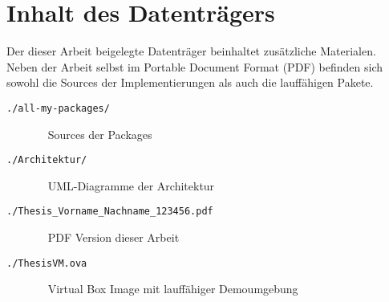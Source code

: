 \section{Inhalt des Datenträgers}
\label{apx:Datentraeger}

Der dieser Arbeit beigelegte Datenträger beinhaltet zusätzliche Materialen. 
Neben der Arbeit selbst im Portable Document Format (PDF) befinden sich sowohl die Sources der Implementierungen als auch die lauffähigen Pakete.

\begin{description}
\item[\texttt{./all-my-packages/}] ~ \linebreak 
\noindent\hspace*{10mm} Sources der Packages
\item[\texttt{./Architektur/}] ~ \linebreak 
\noindent\hspace*{10mm} UML-Diagramme der Architektur
\item[\texttt{./Thesis\_Vorname\_Nachname\_123456.pdf}] ~ \linebreak 
\noindent\hspace*{10mm} PDF Version dieser Arbeit
\item[\texttt{./ThesisVM.ova}] ~ \linebreak 
\noindent\hspace*{10mm} Virtual Box Image mit lauffähiger Demoumgebung
\end{description}